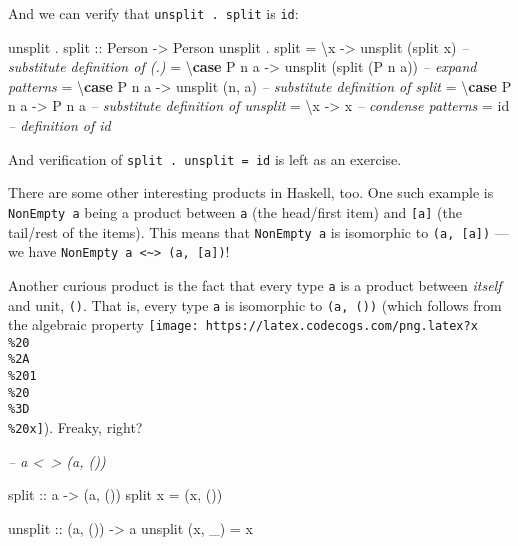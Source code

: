 \documentclass[]{article}
\newenvironment{Shaded}{}{}
\newcommand{\CommentTok}[1]{\textcolor[rgb]{0.38,0.63,0.69}{\textit{#1}}}
\newcommand{\DataTypeTok}[1]{\textcolor[rgb]{0.56,0.13,0.00}{#1}}
\newcommand{\FunctionTok}[1]{\textcolor[rgb]{0.02,0.16,0.49}{#1}}
\newcommand{\KeywordTok}[1]{\textcolor[rgb]{0.00,0.44,0.13}{\textbf{#1}}}
\newcommand{\NormalTok}[1]{#1}
\newcommand{\OtherTok}[1]{\textcolor[rgb]{0.00,0.44,0.13}{#1}}
\begin{document}
And we can verify that \texttt{unsplit\ .\ split} is \texttt{id}:

\begin{Shaded}
\begin{Highlighting}[]
\NormalTok{unsplit }\FunctionTok{.}\OtherTok{ split ::} \DataTypeTok{Person} \OtherTok{->} \DataTypeTok{Person}
\NormalTok{unsplit }\FunctionTok{.}\NormalTok{ split}
    \FunctionTok{=}\NormalTok{ \textbackslash{}x          }\OtherTok{->}\NormalTok{ unsplit (split x)        }\CommentTok{-- substitute definition of (.)}
    \FunctionTok{=}\NormalTok{ \textbackslash{}}\KeywordTok{case} \DataTypeTok{P}\NormalTok{ n a }\OtherTok{->}\NormalTok{ unsplit (split (}\DataTypeTok{P}\NormalTok{ n a))  }\CommentTok{-- expand patterns}
    \FunctionTok{=}\NormalTok{ \textbackslash{}}\KeywordTok{case} \DataTypeTok{P}\NormalTok{ n a }\OtherTok{->}\NormalTok{ unsplit (n, a)           }\CommentTok{-- substitute definition of split}
    \FunctionTok{=}\NormalTok{ \textbackslash{}}\KeywordTok{case} \DataTypeTok{P}\NormalTok{ n a }\OtherTok{->} \DataTypeTok{P}\NormalTok{ n a                    }\CommentTok{-- substitute definition of unsplit}
    \FunctionTok{=}\NormalTok{ \textbackslash{}x      }\OtherTok{->}\NormalTok{ x                            }\CommentTok{-- condense patterns}
    \FunctionTok{=}\NormalTok{ id                                      }\CommentTok{-- definition of id}
\end{Highlighting}
\end{Shaded}

And verification of \texttt{split\ .\ unsplit\ =\ id} is left as an exercise.

There are some other interesting products in Haskell, too. One such example is
\texttt{NonEmpty\ a} being a product between \texttt{a} (the head/first item)
and \texttt{{[}a{]}} (the tail/rest of the items). This means that
\texttt{NonEmpty\ a} is isomorphic to \texttt{(a,\ {[}a{]})} --- we have
\texttt{NonEmpty\ a\ \textless{}\textasciitilde{}\textgreater{}\ (a,\ {[}a{]})}!

Another curious product is the fact that every type \texttt{a} is a product
between \emph{itself} and unit, \texttt{()}. That is, every type \texttt{a} is
isomorphic to \texttt{(a,\ ())} (which follows from the algebraic property
\texttt{[image: https://latex.codecogs.com/png.latex?x\\\%20\\\%2A\\\%201\\\%20\\\%3D\\\%20x]}).
Freaky, right?

\begin{Shaded}
\begin{Highlighting}[]
\CommentTok{-- a <~> (a, ())}

\OtherTok{split ::}\NormalTok{ a }\OtherTok{->}\NormalTok{ (a, ())}
\NormalTok{split x }\FunctionTok{=}\NormalTok{ (x, ())}

\OtherTok{unsplit ::}\NormalTok{ (a, ()) }\OtherTok{->}\NormalTok{ a}
\NormalTok{unsplit (x, _) }\FunctionTok{=}\NormalTok{ x}
\end{Highlighting}
\end{Shaded}
\end{document}
